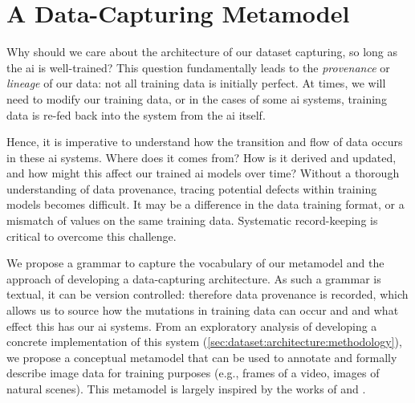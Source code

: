\section{A Data-Capturing Metamodel}
\label{sec:dataset:architecture}

Why should we care about the architecture of our dataset capturing, so long as the \gls{ai} is well-trained? This question fundamentally leads to the \textit{provenance} or \textit{lineage} of our data: not all training data is initially perfect. At times, we will need to modify our training data, or in the cases of some \gls{ai} systems, training data is re-fed back into the system from the \gls{ai} itself. 

Hence, it is imperative to understand how the transition and flow of data occurs \citep{Cui:2003im,Ikeda:2009ca,Buneman:2000bn} in these \gls{ai} systems. Where does it comes from? How is it derived and updated, and how might this affect our trained \gls{ai} models over time? Without a thorough understanding of data provenance, tracing potential defects within training models becomes difficult. It may be a difference in the data training format, or a mismatch of values on the same training data. Systematic record-keeping is critical to overcome this challenge.

We propose a grammar to capture the vocabulary of our metamodel and the approach of developing a data-capturing architecture. As such a grammar is textual, it can be version controlled: therefore data provenance is recorded, which allows us to source how the mutations in training data can occur and and what effect this has our \gls{ai} systems. From an exploratory analysis of developing a concrete implementation of this system (\cref{sec:dataset:architecture:methodology}), we propose a conceptual metamodel that can be used to annotate and formally describe image data for training purposes (e.g., frames of a video, images of natural scenes). This metamodel is largely inspired by the works of \citet{Wickham:2010hy, Wickham:2007tu} and \citet{Moody:2009vo}.




